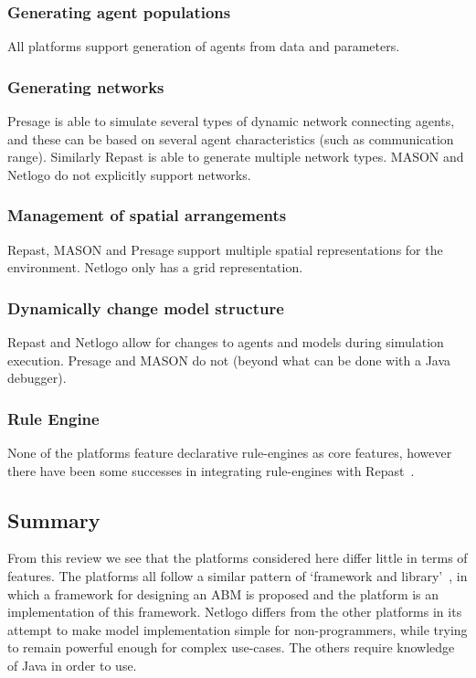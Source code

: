 \subsubsection*{Generating agent populations}

All platforms support generation of agents from data and parameters. 

\subsubsection*{Generating networks}

Presage is able to simulate several types of dynamic network connecting agents, and these can be based on several agent characteristics (such as communication range). Similarly Repast is able to generate multiple network types. MASON and Netlogo do not explicitly support networks.

\subsubsection*{Management of spatial arrangements}

Repast, MASON and Presage support multiple spatial representations for the environment. Netlogo only has a grid representation.

\subsubsection*{Dynamically change model structure}

Repast and Netlogo allow for changes to agents and models during simulation execution. Presage and MASON do not (beyond what can be done with a Java debugger).

\subsubsection*{Rule Engine}

None of the platforms feature declarative rule-engines as core features, however there have been some successes in integrating rule-engines with Repast~\citep{Lotzmann2011}. 

\subsection{Summary}

From this review we see that the platforms considered here differ little in terms of features. The platforms all follow a similar pattern of `framework and library'~\citep{Railsback2006}, in which a framework for designing an \ac{ABM} is proposed and the platform is an implementation of this framework. Netlogo differs from the other platforms in its attempt to make model implementation simple for non-programmers, while trying to remain powerful enough for complex use-cases. The others require knowledge of Java in order to use. 

